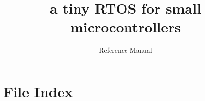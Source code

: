 \documentclass[12pt,a4paper,american,normalheadings,titlepage]{scrreprt}
\newcommand{\+}{\discretionary{\mbox{\scriptsize$\hookleftarrow$}}{}{}}
\newcommand{\clearemptydoublepage}{%
  \newpage{\pagestyle{empty}\cleardoublepage}%
}
\begin{document}
\title{a tiny RTOS for small microcontrollers}
\subtitle{Reference Manual}
\maketitle

\clearemptydoublepage
\tableofcontents
\clearemptydoublepage
{}
\hypersetup{pageanchor=true}

\chapter{File Index}

\end{document}
